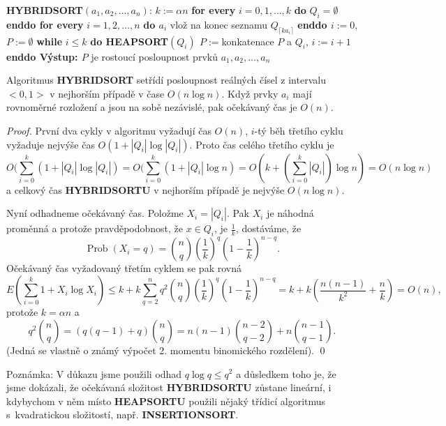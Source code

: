 \documentclass[a4paper,12pt]{article}
\DeclareMathOperator*{\Prob}{Prob}
\begin{document}
{\bf HYBRIDSORT$(a_1,a_2,\dots,a_n)$}:\newline 
$k:=\alpha n$\newline 
{\bf for every} $i=0,1,\dots,k$ {\bf do} $Q_i=\emptyset$ {\bf enddo\newline 
for every} $i=1,2,\dots,n$ {\bf do\newline 
\phantom{{\rm ---}}$a_i$} vlož na konec seznamu $Q_{\lceil ka_
i\rceil}$\newline 
{\bf enddo\newline 
$i:=0$}, $P:=\emptyset$\newline 
{\bf while} $i\le k$ {\bf do\newline 
\phantom{{\rm ---}}HEAPSORT$(Q_i)$
$P:=$}konkatenace $P$ a $Q_i$, $i:=i+1$\newline 
{\bf enddo\newline 
Výstup: $P$} je rostoucí posloupnost prvků 
$a_1,a_2,\dots,a_n$

\begin{veta}Algoritmus {\bf HYBRIDSORT} setřídí 
posloupnost reál\-ných čísel z intervalu $<0,1>$ v 
nejhorším případě v čase $O(n\log n)$. Když prvky $
a_i$ 
mají rovnoměrné rozložení a jsou na sobě nezá\-vislé, 
pak očekávaný čas je $O(n)$.
\end{veta}

\begin{proof}První dva cykly v algoritmu 
vyžadují čas $O(n)$, $i$-tý běh třetího cyklu vyžaduje 
nejvýše čas $O(1+|Q_i|\log|Q_i|)$. Proto čas celého třetího cyklu je 
$$O(\sum_{i=0}^k(1+|Q_i|\log|Q_i|)=O(\sum_{i=0}^k(1+|Q_i|\log n)=
O(k+(\sum_{i=0}^k|Q_i|)\log n)=O(n\log n)$$
a celkový čas {\bf HYBRIDSORTU} v nejhorším případě je nejvýše $
O(n\log n)$.

Nyní odhadneme očekávaný čas. Položme 
$X_i=|Q_i|$. Pak 
$X_i$ je ná\-hodná proměnná a 
protože pravděpodobnost, že $x\in Q_i$, je $\frac 1k$, dostá\-váme, že 
$$\Prob(X_i=q)=\binom nq(\frac 1k)^q(1-\frac 1k)^{n-q}.$$
Očekávaný čas vyžadovaný třetím cyklem se pak rovná 
$$E(\sum_{i=0}^k1+X_i\log X_i)\le k+k\sum_{q=2}^nq^2\binom nq(\frac 
1k)^q(1-\frac 1k)^{n-q}=k+k(\frac {n(n-1)}{k^2}+\frac nk)=O(n),$$
protože $k=\alpha n$ a 
$$q^2\binom nq=(q(q-1)+q)\binom nq=n(n-1)\binom {n-2}{q-2}+n\binom {
n-1}{q-1}.$$
(Jedná se vlastně o známý výpočet 2. momentu 
binomického rozdělení). \qed
\end{proof}

Poznámka: V důkazu jsme použili odhad 
$q\log q\le q^2$ a důsledkem toho je, že jsme 
dokázali, že očekávaná složitost {\bf HYBRIDSORTU }
zůstane lineární, i kdybychom v něm místo 
{\bf HEAPSORTU} použili nějaký třídicí algoritmus s~kvadratickou složitostí, např. {\bf INSERTIONSORT}.
\end{document}
